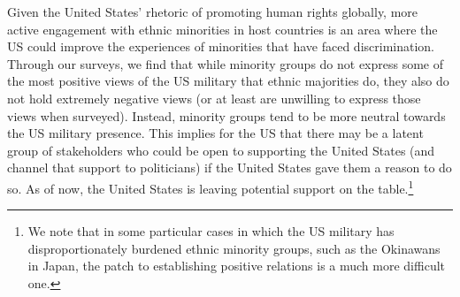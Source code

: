 Given the United States' rhetoric of promoting human rights globally, more active engagement with ethnic minorities in host countries is an area where the US could improve the experiences of minorities that have faced discrimination. Through our surveys, we find that while minority groups do not express some of the most positive views of the US military that ethnic majorities do, they also do not hold extremely negative views (or at least are unwilling to express those views when surveyed). Instead, minority groups tend to be more neutral towards the US military presence. This implies for the US that there may be a latent group of stakeholders who could be open to supporting the United States (and channel that support to politicians) if the United States gave them a reason to do so. As of now, the United States is leaving potential support on the table.\footnote{We note that in some particular cases in which the US military has disproportionately burdened ethnic minority groups, such as the Okinawans in Japan, the patch to establishing positive relations is a much more difficult one.}



